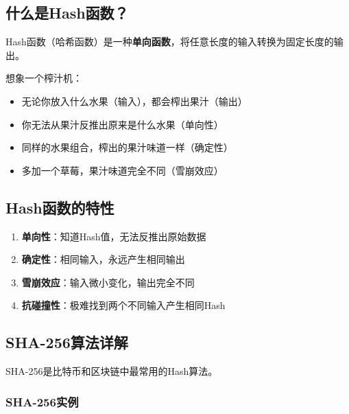 \documentclass[12pt,a4paper]{article}
\begin{document}
\subsection{什么是Hash函数？}

Hash函数（哈希函数）是一种\textbf{单向函数}，将任意长度的输入转换为固定长度的输出。

\begin{examplebox}[生活实例]
想象一个榨汁机：
\begin{itemize}
\item 无论你放入什么水果（输入），都会榨出果汁（输出）
\item 你无法从果汁反推出原来是什么水果（单向性）
\item 同样的水果组合，榨出的果汁味道一样（确定性）
\item 多加一个草莓，果汁味道完全不同（雪崩效应）
\end{itemize}
\end{examplebox}

\subsection{Hash函数的特性}

\begin{enumerate}[leftmargin=1.5em]
\item \textbf{单向性}：知道Hash值，无法反推出原始数据
\item \textbf{确定性}：相同输入，永远产生相同输出
\item \textbf{雪崩效应}：输入微小变化，输出完全不同
\item \textbf{抗碰撞性}：极难找到两个不同输入产生相同Hash
\end{enumerate}

\subsection{SHA-256算法详解}

SHA-256是比特币和区块链中最常用的Hash算法。

\subsubsection{SHA-256实例}
\end{document}
